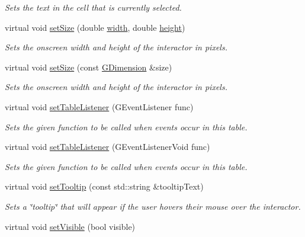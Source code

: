 \begin{DoxyCompactItemize}
\begin{DoxyCompactList}\small\item\em Sets the text in the cell that is currently selected. \end{DoxyCompactList}\item 
virtual void \mbox{\hyperlink{classGInteractor_aca25d49481f9bf5fc8f7df4c086c4ce7}{set\+Size}} (double \mbox{\hyperlink{classGTable_ad72663daf610f2a0833a2fc3d78e4fdf}{width}}, double \mbox{\hyperlink{classGTable_ad3774f6419003470f54fd495124ef51f}{height}})
\begin{DoxyCompactList}\small\item\em Sets the onscreen width and height of the interactor in pixels. \end{DoxyCompactList}\item 
virtual void \mbox{\hyperlink{classGInteractor_ae2b628228f192c2702c4ce941b2af68f}{set\+Size}} (const \mbox{\hyperlink{structGDimension}{G\+Dimension}} \&size)
\begin{DoxyCompactList}\small\item\em Sets the onscreen width and height of the interactor in pixels. \end{DoxyCompactList}\item 
virtual void \mbox{\hyperlink{classGTable_aeeb00b5caf01028e9de6f2dd6ef4b9bd}{set\+Table\+Listener}} (G\+Event\+Listener func)
\begin{DoxyCompactList}\small\item\em Sets the given function to be called when events occur in this table. \end{DoxyCompactList}\item 
virtual void \mbox{\hyperlink{classGTable_a0412cb4e079085ed5cb3bcdf2921ac84}{set\+Table\+Listener}} (G\+Event\+Listener\+Void func)
\begin{DoxyCompactList}\small\item\em Sets the given function to be called when events occur in this table. \end{DoxyCompactList}\item 
virtual void \mbox{\hyperlink{classGInteractor_a039e0e49beaecc275efce02d416acea8}{set\+Tooltip}} (const std\+::string \&tooltip\+Text)
\begin{DoxyCompactList}\small\item\em Sets a \char`\"{}tooltip\char`\"{} that will appear if the user hovers their mouse over the interactor. \end{DoxyCompactList}\item 
virtual void \mbox{\hyperlink{classGInteractor_a18e44e30b31525a243960ca3928125aa}{set\+Visible}} (bool visible)

\end{DoxyCompactItemize}
